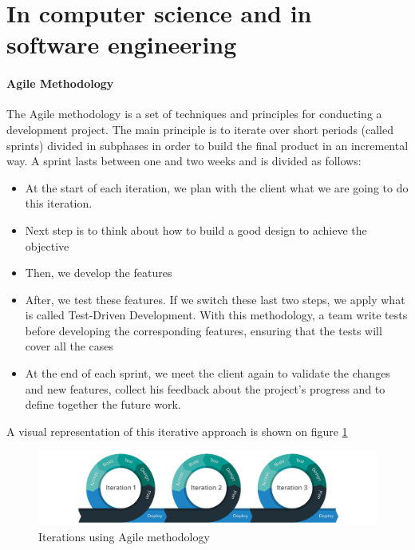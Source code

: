 
\section{In computer science and in software engineering}
\paragraph{Agile Methodology}
The Agile methodology is a set of techniques and principles for conducting a development project. The main principle is to iterate over short periods (called sprints) divided in subphases in order to build the final product in an incremental way.
A sprint lasts between one and two weeks and is divided as follows: 
\begin{itemize}
    \item At the start of each iteration, we plan with the client what we are going to do this iteration.
    \item Next step is to think about how to build a good design to achieve the objective
    \item Then, we develop the features
    \item After, we test these features. If we switch these last two steps, we apply what is called Test-Driven Development. With this methodology, a team write tests before developing the corresponding features, ensuring that the tests will cover all the cases
    \item At the end of each sprint, we meet the client again to validate the changes and new features, collect his feedback about the project's progress and to define together the future work.
\end{itemize}
A visual representation of this iterative approach is shown on figure \ref{fig:agile-methodology}


\begin{figure}
    \centering
    \includegraphics[width=\textwidth]{images/agile-methodolody.png}
    \caption{Iterations using Agile methodology}
    \label{fig:agile-methodology}
\end{figure}

